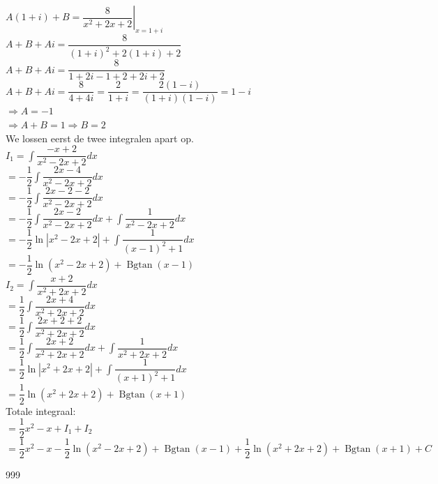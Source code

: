 \documentclass[a4paper]{article}
\newcommand{\dint}{\displaystyle\int}
\newcommand{\Bgtan}{\operatorname{Bgtan}}
\begin{document}
$A(1+i)+B = \left. \dfrac{8}{x^2+2x+2} \right|_{x=1+i}$ \\

$A + B + Ai = \dfrac{8}{(1+i)^2+2(1+i)+2}$ \\

$A + B + Ai = \dfrac{8}{1+2i-1+2+2i+2}$ \\

$A + B + Ai = \dfrac{8}{4+4i} = \dfrac{2}{1+i} = \dfrac{2(1-i)}{(1+i)(1-i)} = 1-i$ \\

$\Rightarrow A = -1$ \\

$\Rightarrow A + B = 1 \Rightarrow B = 2$ \\

We lossen eerst de twee integralen apart op. \\

$I_1 = \dint \dfrac{-x+2}{x^2-2x+2} dx$ \\

$= -\dfrac{1}{2} \dint \dfrac{2x-4}{x^2-2x+2} dx$ \\

$= -\dfrac{1}{2} \dint \dfrac{2x-2-2}{x^2-2x+2} dx$ \\

$= -\dfrac{1}{2} \dint \dfrac{2x-2}{x^2-2x+2} dx + \dint \dfrac{1}{x^2-2x+2} dx$ \\

$= -\dfrac{1}{2} \ln|x^2-2x+2| + \dint \dfrac{1}{(x-1)^2+1} dx$ \\

$= -\dfrac{1}{2} \ln(x^2-2x+2) + \Bgtan(x-1)$ \\

$I_2 = \dint \dfrac{x+2}{x^2+2x+2} dx$ \\

$= \dfrac{1}{2} \dint \dfrac{2x+4}{x^2+2x+2} dx$ \\

$= \dfrac{1}{2} \dint \dfrac{2x+2+2}{x^2+2x+2} dx$ \\

$= \dfrac{1}{2} \dint \dfrac{2x+2}{x^2+2x+2} dx + \dint \dfrac{1}{x^2+2x+2} dx$ \\

$= \dfrac{1}{2} \ln|x^2+2x+2| + \dint \dfrac{1}{(x+1)^2+1} dx$ \\

$= \dfrac{1}{2} \ln(x^2+2x+2) + \Bgtan(x+1)$ \\

Totale integraal: \\

$= \dfrac{1}{2}x^2 - x + I_1 + I_2$ \\

$= \dfrac{1}{2}x^2 - x - \dfrac{1}{2} \ln(x^2-2x+2) + \Bgtan(x-1) + \dfrac{1}{2} \ln(x^2+2x+2) + \Bgtan(x+1) + C$ \\




\begin{thebibliography}{999}
\end{thebibliography}
\end{document}
